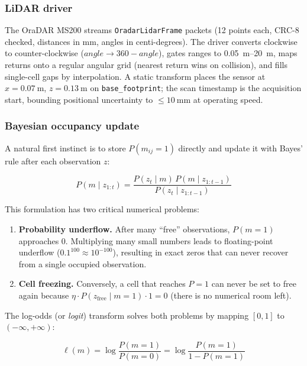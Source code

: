 \documentclass[conference]{IEEEtran}
\begin{document}
\subsubsection{LiDAR driver}
The OraDAR MS200 streams \texttt{OradarLidarFrame} packets (12 points each,
CRC-8 checked, distances in mm, angles in centi-degrees). The driver converts
clockwise to counter-clockwise ($\textit{angle}\to360-\textit{angle}$), gates
ranges to \SIrange{0.05}{20}{\meter}, maps returns onto a regular angular grid
(nearest return wins on collision), and fills single-cell gaps by interpolation.
A static transform places the sensor at $x=\SI{0.07}{\meter}$,
$z=\SI{0.13}{\meter}$ on \texttt{base\_footprint}; the scan timestamp is the
acquisition start, bounding positional uncertainty to ${\leq}\SI{10}{\milli\meter}$
at operating speed.

\subsubsection{Bayesian occupancy update}
A natural first instinct is to store $P(m_{ij} = 1)$ directly and update it with Bayes' rule after each observation $z$:
 
\[
  P(m \mid z_{1:t}) = \frac{P(z_t \mid m)\, P(m \mid z_{1:t-1})}{P(z_t \mid z_{1:t-1})}
\]
 
This formulation has two critical numerical problems:
 
\begin{enumerate}
  \item \textbf{Probability underflow.} After many ``free'' observations, $P(m=1)$ approaches 0. Multiplying many small numbers leads to floating-point underflow ($0.1^{100} \approx 10^{-100}$), resulting in exact zeros that can never recover from a single occupied observation.
 
  \item \textbf{Cell freezing.} Conversely, a cell that reaches $P=1$ can never be set to free again because $\eta \cdot P(z_\text{free} \mid m=1) \cdot 1 = 0$ (there is no numerical room left).
\end{enumerate}
 
The log-odds (or \emph{logit}) transform solves both problems by mapping $[0,1]$ to $(-\infty, +\infty)$:
 
\begin{equation}
  \ell(m) = \log \frac{P(m=1)}{P(m=0)} = \log \frac{P(m=1)}{1 - P(m=1)}
  \label{eq:logodds}
\end{equation}
 
\end{document}
